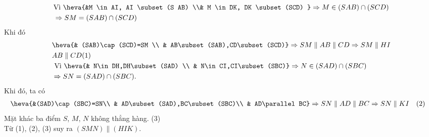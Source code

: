 \begin{ex}
{\begin{itemize}
$$\begin{aligned}
   &  \text {Vì }\heva{&M \in AI, AI \subset(S AB) \\&
    M \in DK, DK \subset(SCD)
   } \Rightarrow M \in(SAB) \cap(SCD)\\ 
    & \Rightarrow SM=(SAB) \cap(SCD)
  \end{aligned}
   $$
   Khi đó
  $$\begin{aligned}
  & \heva{& (SAB)\cap (SCD)=SM \\ & AB\subset (SAB),CD\subset (SCD)}\Rightarrow SM\parallel AB\parallel CD\Rightarrow SM\parallel HI \\ & AB\parallel CD (1)  \\
  & \text{ Vì }\heva{& N\in DH,DH\subset (SAD) \\ & N\in CI,CI\subset (SBC)}\Rightarrow  N\in (SAD)\cap (SBC) \\
  & \Rightarrow SN=(SAD)\cap (SBC). 
 \end{aligned}$$
 Khi đó, ta  có
  $$
 \begin{aligned}
  \heva{&(SAD)\cap(SBC)=SN\\ & AD\subset(SAD),BC\subset(SBC)\\ & AD\parallel  BC}&\Rightarrow SN\parallel AD\parallel BC\Rightarrow SN\parallel KI\quad (2)
 \end{aligned}$$
 Mặt khác ba điểm $S$, $M$,  $N$ không thẳng hàng. (3) \\
 Từ (1), (2), (3) suy ra  $(SMN) \parallel(HIK)$.
 \end{itemize}
} 
\end{ex}

